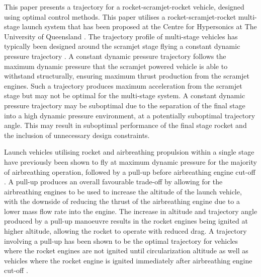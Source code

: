 \documentclass[]{aiaa-tc}
\begin{document}
This paper presents a trajectory for a rocket-scramjet-rocket vehicle, designed using optimal control methods. This paper utilises a rocket-scramjet-rocket multi-stage launch system that has been proposed at the Centre for Hypersonics at The University of Queensland \cite{Smart2009a}. 
The trajectory profile of multi-stage vehicles has typically been designed around the scramjet stage flying a constant dynamic pressure trajectory \cite{Kimura1999,Olds1998,Preller2015a}.
 A constant dynamic pressure trajectory follows the maximum dynamic pressure that the scramjet powered vehicle is able to withstand structurally, ensuring maximum thrust production from the scramjet engines. 
 Such a trajectory produces maximum acceleration from the scramjet stage but may not be optimal for the multi-stage system. 
 A constant dynamic pressure trajectory may be suboptimal due to the separation of the final stage into a high dynamic pressure environment, at a potentially suboptimal trajectory angle. This may result in suboptimal performance of the final stage rocket  and the inclusion of unnecessary design constraints. 
 
  
 Launch vehicles utilising rocket and airbreathing propulsion within a single stage have previously been shown to fly at maximum dynamic pressure for the majority of airbreathing operation, followed by a pull-up before airbreathing engine cut-off \cite{Powell1991,Lu1993,Trefny1999}. 
A pull-up produces an overall favourable trade-off by allowing for the airbreathing engines to be used to increase the altitude of the launch vehicle, with the downside of reducing the thrust of the airbreathing engine due to a lower mass flow rate into the engine. The increase in altitude and trajectory angle produced by a pull-up manoeuvre results in the rocket engines being ignited at higher altitude, allowing the rocket to operate with reduced drag. A trajectory involving a pull-up has been shown to be the optimal trajectory for vehicles where the rocket engines are not ignited until circularization altitude \cite{Powell1991,Lu1993} as well as vehicles where the rocket engine is ignited immediately after airbreathing engine cut-off \cite{Trefny1999}.
\end{document}
